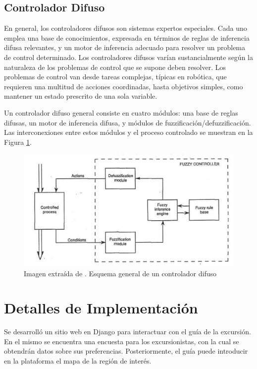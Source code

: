 \documentclass[10pt,twocolumn]{article}
\begin{document}
	\subsection{Controlador Difuso}
	
	En general, los controladores difusos son sistemas expertos especiales. Cada uno emplea una base de conocimientos, expresada en términos de reglas de inferencia difusa relevantes, y un motor de inferencia adecuado para resolver un problema de control determinado. Los controladores difusos varían sustancialmente según la naturaleza de los problemas de control que se supone deben resolver. Los problemas de control van desde tareas complejas, típicas en robótica, que requieren una multitud de acciones coordinadas, hasta objetivos simples, como mantener un estado prescrito de una sola variable.\cite{Fuzzy}
	
	Un controlador difuso general consiste en cuatro módulos: una base de reglas difusas, un motor de inferencia difusa, y módulos de fuzzificación/defuzzificación. Las interconexiones entre estos módulos y el proceso controlado se muestran en la Figura \ref{fig:diagram}.
	
	\begin{figure}[h]
		\centering
		\includegraphics[width=\linewidth]{diagram}
		\caption{Imagen extraída de \cite{Fuzzy}. Esquema general de un controlador difuso}
		\label{fig:diagram}
	\end{figure}
	
	
	\section{Detalles de Implementación}
	
	Se desarrolló un sitio web en Django para interactuar con el guía de la excursión. En el mismo se encuentra una encuesta para los excursionistas, con la cual se obtendrán datos sobre sus preferencias. Posteriormente, el guía puede introducir en la plataforma el mapa de la región de interés.
	
\end{document}
